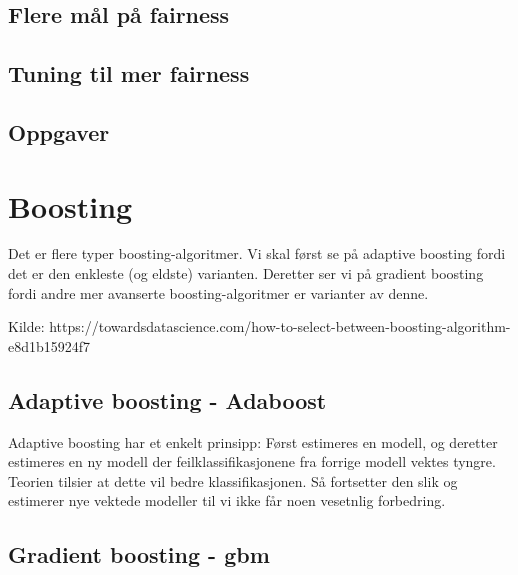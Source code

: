 \documentclass[
  letterpaper,
  DIV=11,
  numbers=noendperiod]{scrreprt}
\theoremstyle{definition}
\theoremstyle{remark}
\begin{document}
\hypertarget{flere-muxe5l-puxe5-fairness}{%
\section{Flere mål på fairness}\label{flere-muxe5l-puxe5-fairness}}

\hypertarget{tuning-til-mer-fairness}{%
\section{Tuning til mer fairness}\label{tuning-til-mer-fairness}}

\hypertarget{oppgaver-6}{%
\section{Oppgaver}\label{oppgaver-6}}


\hypertarget{boosting}{%
\chapter{Boosting}\label{boosting}}

Det er flere typer boosting-algoritmer. Vi skal først se på adaptive
boosting fordi det er den enkleste (og eldste) varianten. Deretter ser
vi på gradient boosting fordi andre mer avanserte boosting-algoritmer er
varianter av denne.

Kilde:
https://towardsdatascience.com/how-to-select-between-boosting-algorithm-e8d1b15924f7

\hypertarget{adaptive-boosting---adaboost}{%
\section{Adaptive boosting -
Adaboost}\label{adaptive-boosting---adaboost}}

Adaptive boosting har et enkelt prinsipp: Først estimeres en modell, og
deretter estimeres en ny modell der feilklassifikasjonene fra forrige
modell vektes tyngre. Teorien tilsier at dette vil bedre
klassifikasjonen. Så fortsetter den slik og estimerer nye vektede
modeller til vi ikke får noen vesetnlig forbedring.

\hypertarget{gradient-boosting---gbm}{%
\section{Gradient boosting - gbm}\label{gradient-boosting---gbm}}
\end{document}
